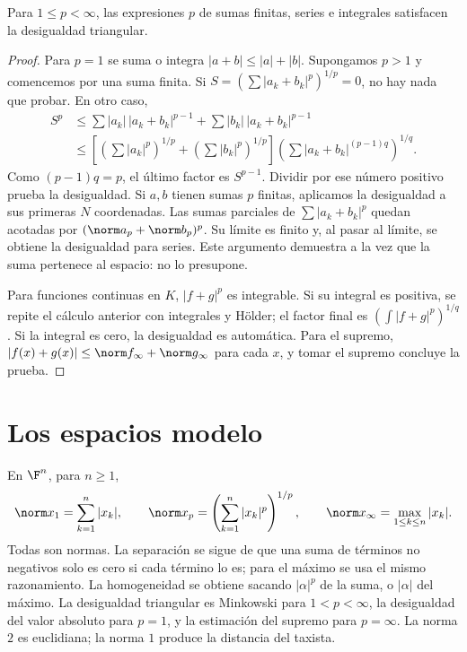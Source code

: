 \begin{teorema}[Minkowski]\label{ch01:minkowski}
Para $1\le p<\infty$, las expresiones $p$ de sumas finitas, series e integrales satisfacen la desigualdad triangular.
\end{teorema}
\begin{proof}
Para $p=1$ se suma o integra $|a+b|\le|a|+|b|$. Supongamos $p>1$ y comencemos por una suma finita. Si $S=(\sum|a_k+b_k|^p)^{1/p}=0$, no hay nada que probar. En otro caso,
\begin{align*}
S^p&\le\sum|a_k|\,|a_k+b_k|^{p-1}+\sum|b_k|\,|a_k+b_k|^{p-1}\\
&\le\left[\left(\sum|a_k|^p\right)^{1/p}
+\left(\sum|b_k|^p\right)^{1/p}\right]
\left(\sum|a_k+b_k|^{(p-1)q}\right)^{1/q}.
\end{align*}
Como $(p-1)q=p$, el último factor es $S^{p-1}$. Dividir por ese número positivo prueba la desigualdad. Si $a,b$ tienen sumas $p$ finitas, aplicamos la desigualdad a sus primeras $N$ coordenadas. Las sumas parciales de $\sum|a_k+b_k|^p$ quedan acotadas por $(\norm a_p+\norm b_p)^p$. Su límite es finito y, al pasar al límite, se obtiene la desigualdad para series. Este argumento demuestra a la vez que la suma pertenece al espacio: no lo presupone.

Para funciones continuas en $K$, $|f+g|^p$ es integrable. Si su integral es positiva, se repite el cálculo anterior con integrales y Hölder; el factor final es $(\int|f+g|^p)^{1/q}$. Si la integral es cero, la desigualdad es automática. Para el supremo, $|f(x)+g(x)|\le\norm f_\infty+\norm g_\infty$ para cada $x$, y tomar el supremo concluye la prueba.
\end{proof}

\section{Los espacios modelo}
\begin{ejemplo}
En $\F^n$, para $n\ge1$,
\[
\norm x_1=\sum_{k=1}^n|x_k|,\qquad
\norm x_p=\left(\sum_{k=1}^n|x_k|^p\right)^{1/p},\qquad
\norm x_\infty=\max_{1\le k\le n}|x_k|.
\]
Todas son normas. La separación se sigue de que una suma de términos no negativos solo es cero si cada término lo es; para el máximo se usa el mismo razonamiento. La homogeneidad se obtiene sacando $|\alpha|^p$ de la suma, o $|\alpha|$ del máximo. La desigualdad triangular es Minkowski para $1<p<\infty$, la desigualdad del valor absoluto para $p=1$, y la estimación del supremo para $p=\infty$. La norma $2$ es euclidiana; la norma $1$ produce la distancia del taxista.
\end{ejemplo}


